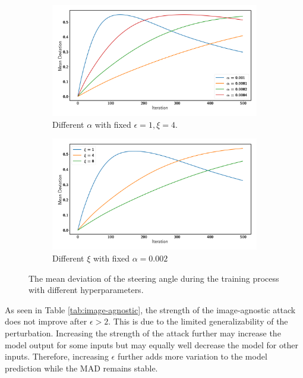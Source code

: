 \begin{figure}[t]
    \centering

    \begin{subfigure}[b]{0.8\textwidth}
        \includegraphics[width=\textwidth]{figures/chapter_driving/alpha.png}
        \caption{Different $\alpha$ with fixed $\epsilon=1, \xi=4$.}
        \label{fig:random}
    \end{subfigure}

    \begin{subfigure}[b]{0.8\textwidth}
        \includegraphics[width=\textwidth]{figures/chapter_driving/xi.png}
        \caption{Different $\xi$ with fixed $\alpha=0.002$}
        \label{fig:left}
    \end{subfigure}

    \caption{The mean deviation of the steering angle during the training process with different hyperparameters.\label{figure_hyperparameters}}
\end{figure}

As seen in Table \ref{tab:image-agnostic}, the strength of the image-agnostic attack does not improve after $\epsilon > 2$. This is due to the limited generalizability of the perturbation. Increasing the strength of the attack further may increase the model output for some inputs but may equally well decrease the model for other inputs. Therefore, increasing $\epsilon$ further adds more variation to the model prediction while the MAD remains stable.

